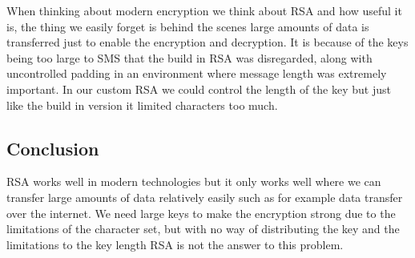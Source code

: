 When thinking about modern encryption we think about RSA and how useful it is, the thing we easily forget is behind the scenes large amounts of data is transferred just to enable the encryption and decryption. It is because of the keys being too large to SMS that the build in RSA was disregarded, along with uncontrolled padding in an environment where message length was extremely important. In our custom RSA we could control the length of the key but just like the build in version it limited characters too much.
\subsection*{Conclusion}

RSA works well in modern technologies but it only works well where we can transfer large amounts of data relatively easily such as for example data transfer over the internet. We need large keys to make the encryption strong due to the limitations of the character set, but with no way of distributing the key and the limitations to the key length RSA is not the answer to this problem.